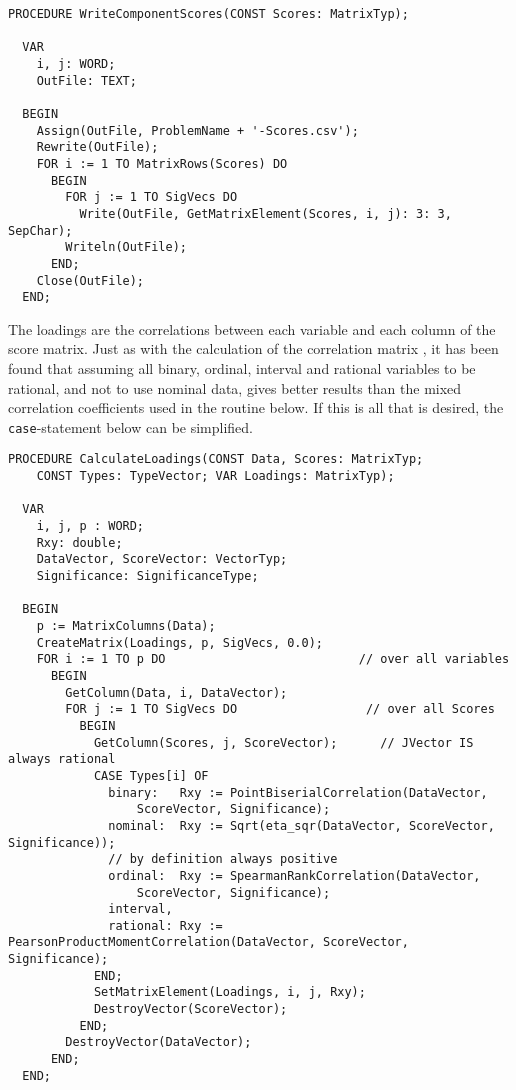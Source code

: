 \begin{lstlisting}[caption=Robust calculation of scores]
  PROCEDURE WriteComponentScores(CONST Scores: MatrixTyp);

  VAR
    i, j: WORD;
    OutFile: TEXT;

  BEGIN
    Assign(OutFile, ProblemName + '-Scores.csv');
    Rewrite(OutFile);
    FOR i := 1 TO MatrixRows(Scores) DO
      BEGIN
        FOR j := 1 TO SigVecs DO
          Write(OutFile, GetMatrixElement(Scores, i, j): 3: 3, SepChar);
        Writeln(OutFile);
      END;
    Close(OutFile);
  END;
\end{lstlisting}

The loadings  are the correlations between each variable and each column of the score matrix. Just as with the calculation of the correlation matrix , it has been found that assuming all binary, ordinal, interval and rational variables to be rational, and not to use nominal data, gives better results than the mixed correlation coefficients used in the routine below. If this is all that is desired, the \texttt{case}-statement below can be simplified.

\begin{lstlisting}[caption=Calculate and write loadings to csv-file]
  PROCEDURE CalculateLoadings(CONST Data, Scores: MatrixTyp;
    CONST Types: TypeVector; VAR Loadings: MatrixTyp);

  VAR
    i, j, p : WORD;
    Rxy: double;
    DataVector, ScoreVector: VectorTyp;
    Significance: SignificanceType;

  BEGIN
    p := MatrixColumns(Data);
    CreateMatrix(Loadings, p, SigVecs, 0.0);
    FOR i := 1 TO p DO                           // over all variables
      BEGIN
        GetColumn(Data, i, DataVector);
        FOR j := 1 TO SigVecs DO                  // over all Scores
          BEGIN
            GetColumn(Scores, j, ScoreVector);      // JVector IS always rational
            CASE Types[i] OF
              binary:   Rxy := PointBiserialCorrelation(DataVector,
                  ScoreVector, Significance);
              nominal:  Rxy := Sqrt(eta_sqr(DataVector, ScoreVector, Significance));
              // by definition always positive
              ordinal:  Rxy := SpearmanRankCorrelation(DataVector,
                  ScoreVector, Significance);
              interval,
              rational: Rxy := PearsonProductMomentCorrelation(DataVector, ScoreVector, Significance);
            END;
            SetMatrixElement(Loadings, i, j, Rxy);
            DestroyVector(ScoreVector);
          END;
        DestroyVector(DataVector);
      END;
  END;
\end{lstlisting}

